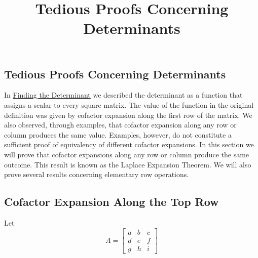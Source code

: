\documentclass{ximera}
\title{Tedious Proofs Concerning Determinants} \license{CC BY-NC-SA 4.0}
\begin{document}
\begin{abstract}

\end{abstract}
\maketitle

\begin{onlineOnly}
\section*{Tedious Proofs Concerning Determinants}
\end{onlineOnly}


In \href{https://ximera.osu.edu/linearalgebradzv3/LinearAlgebraInteractiveIntro/DET-0010/main}{Finding the Determinant} we described the determinant as a function that assigns a scalar to every square matrix.  The value of the function in the original definition was given by cofactor expansion along the first row of the matrix.  We also observed, through examples, that cofactor expansion along any row or column produces the same value.  Examples, however, do not constitute a sufficient proof of equivalency of different cofactor expansions.  In this section we will prove that cofactor expansions along any row or column produce the same outcome.  This result is known as the Laplace Expansion Theorem.  We will also prove several results concerning elementary row operations.

\subsection*{Cofactor Expansion Along the Top Row}
Let 
$$A=\begin{bmatrix}a&b&c\\d&e&f\\g&h&i\end{bmatrix}$$
\end{document}
